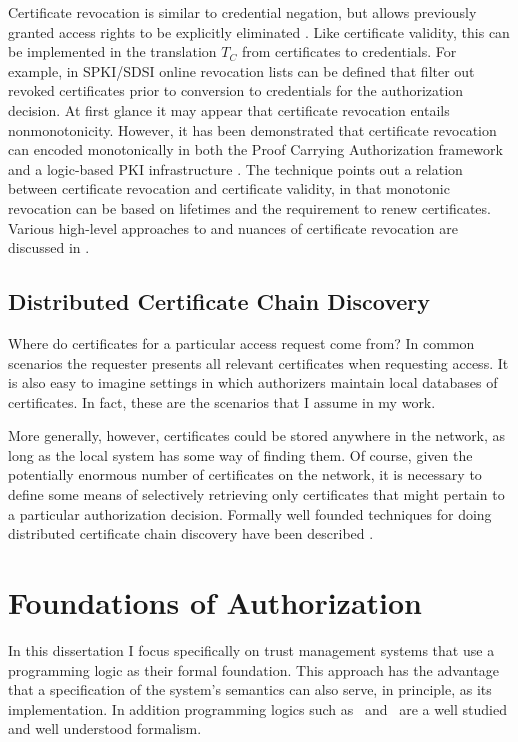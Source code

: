 Certificate revocation is similar to credential negation, but allows previously granted access
rights to be explicitly eliminated \cite{Rivest:CWECRL}. Like certificate validity, this can be
implemented in the translation $T_C$ from certificates to credentials. For example, in SPKI/SDSI
\cite{RFC-2693} online revocation lists can be defined that filter out revoked certificates
prior to conversion to credentials for the authorization decision. At first glance it may appear
that certificate revocation entails nonmonotonicity. However, it has been demonstrated that
certificate revocation can encoded monotonically in both the Proof Carrying Authorization
framework \cite{Bauer:GFACSW} and a logic-based PKI infrastructure \cite{lbi-fc01}. The
technique points out a relation between certificate revocation and certificate validity, in that
monotonic revocation can be based on lifetimes and the requirement to renew certificates.
Various high-level approaches to and nuances of certificate revocation are discussed in
\cite{Rivest:CWECRL}.

\subsection{Distributed Certificate Chain Discovery}

Where do certificates for a particular access request come from? In common scenarios the
requester presents all relevant certificates when requesting access. It is also easy to imagine
settings in which authorizers maintain local databases of certificates. In fact, these are the
scenarios that I assume in my work.

More generally, however, certificates could be stored anywhere in the network, as long as the
local system has some way of finding them. Of course, given the potentially enormous number of
certificates on the network, it is necessary to define some means of selectively retrieving only
certificates that might pertain to a particular authorization decision. Formally well founded
techniques for doing distributed certificate chain discovery have been described
\cite{Li:DCDTM,Gunter:PDCR}.

\section{Foundations of Authorization}
\label{section-foundations}

In this dissertation I focus specifically on trust management systems that use a programming
logic as their formal foundation. This approach has the advantage that a specification of the
system's semantics can also serve, in principle, as its implementation. In addition programming
logics such as \prolog\ and \datalog\ are a well studied and well understood formalism.

